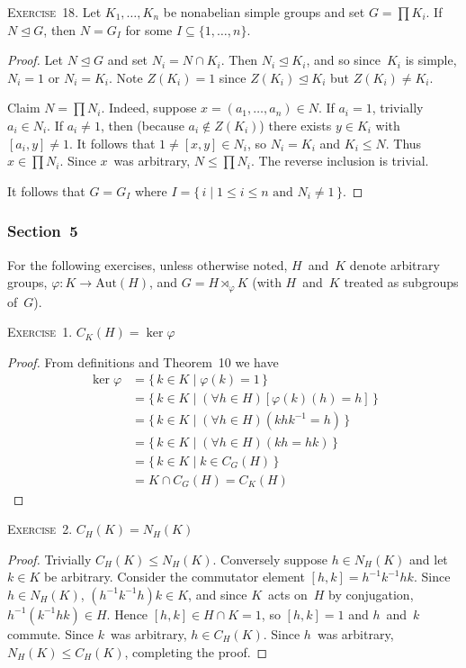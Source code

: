 \documentclass[letterpaper]{article}
\newcommand{\exercise}[1]{\goodbreak\noindent\textsc{Exercise~{#1}.}}
\newcommand{\sect}{\cap}
\newcommand{\subgroup}{\le}
\newcommand{\normal}{\trianglelefteq}
\newcommand{\aut}{\mathrm{Aut}}
\begin{document}
\exercise{18}
Let $K_1,\ldots,K_n$ be nonabelian simple groups and set $G=\prod K_i$. If $N\normal G$, then $N=G_I$ for some $I\subseteq\{1,\ldots,n\}$.
\begin{proof}
Let $N\normal G$ and set $N_i=N\sect K_i$. Then $N_i\normal K_i$, and so since~$K_i$ is simple, $N_i=1$ or $N_i=K_i$. Note $Z(K_i)=1$ since $Z(K_i)\normal K_i$ but $Z(K_i)\ne K_i$.

Claim $N=\prod N_i$. Indeed, suppose $x=(a_1,\ldots,a_n)\in N$. If $a_i=1$, trivially $a_i\in N_i$. If $a_i\ne1$, then (because $a_i\not\in Z(K_i)$) there exists $y\in K_i$ with $[a_i,y]\ne1$. It follows that $1\ne[x,y]\in N_i$, so $N_i=K_i$ and $K_i\subgroup N$. Thus $x\in\prod N_i$. Since $x$~was arbitrary, $N\subgroup\prod N_i$. The reverse inclusion is trivial.

It follows that $G=G_I$ where $I=\{\,i\mid 1\le i\le n\text{ and }N_i\ne1\,\}$.
\end{proof}

\subsubsection*{Section~5}
For the following exercises, unless otherwise noted, $H$~and~$K$ denote arbitrary groups, $\varphi:K\to\aut(H)$, and $G=H\rtimes_{\varphi}K$ (with $H$~and~$K$ treated as subgroups of~$G$).

\bigskip
\exercise{1}
$C_K(H)=\ker\varphi$
\begin{proof}
From definitions and Theorem~10 we have
\begin{align*}
\ker\varphi&=\{\,k\in K\mid\varphi(k)=1\,\}\\
	&=\{\,k\in K\mid(\forall h\in H)[\varphi(k)(h)=h]\,\}\\
	&=\{\,k\in K\mid(\forall h\in H)(khk^{-1}=h)\,\}\\
	&=\{\,k\in K\mid(\forall h\in H)(kh=hk)\,\}\\
	&=\{\,k\in K\mid k\in C_G(H)\,\}\\
	&=K\sect C_G(H)=C_K(H)
\end{align*}
\end{proof}

\exercise{2}
$C_H(K)=N_H(K)$
\begin{proof}
Trivially $C_H(K)\subgroup N_H(K)$. Conversely suppose $h\in N_H(K)$ and let $k\in K$ be arbitrary. Consider the commutator element $[h,k]=h^{-1}k^{-1}hk$. Since $h\in N_H(K)$, $(h^{-1}k^{-1}h)k\in K$, and since $K$~acts on~$H$ by conjugation, $h^{-1}(k^{-1}hk)\in H$. Hence $[h,k]\in H\sect K=1$, so $[h,k]=1$ and $h$~and~$k$ commute. Since $k$~was arbitrary, $h\in C_H(K)$. Since $h$~was arbitrary, $N_H(K)\subgroup C_H(K)$, completing the proof.
\end{proof}
\end{document}
